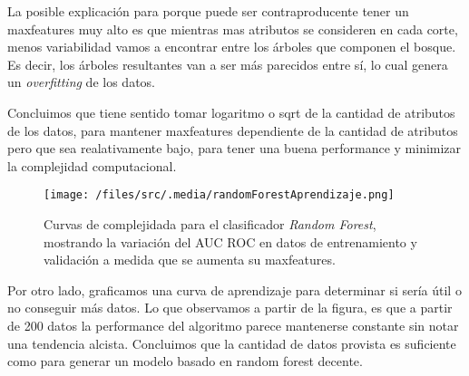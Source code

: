 La posible explicación para porque puede ser contraproducente tener un maxfeatures muy alto es que mientras mas atributos se consideren en cada corte, menos variabilidad vamos a encontrar entre los árboles que componen el bosque. Es decir, los árboles resultantes van a ser más parecidos entre sí, lo cual genera un \textit{overfitting} de los datos.  

Concluimos que tiene sentido tomar logaritmo o sqrt de la cantidad de atributos de los datos, para mantener maxfeatures dependiente de la cantidad de atributos pero que sea realativamente bajo, para tener una buena performance y minimizar la complejidad computacional. 

\begin{figure}[!htbp]
    \centering
    \texttt{[image: /files/src/.media/randomForestAprendizaje.png]}
    \caption{Curvas de complejidada para el clasificador \textit{Random Forest}, mostrando la variación del AUC ROC en datos de entrenamiento y validación a medida que se aumenta su maxfeatures.}
    \label{RFLearning}
\end{figure}


Por otro lado, graficamos una curva de aprendizaje para determinar si sería útil o no conseguir más datos. Lo que observamos a partir de la figura, es que a partir de 200 datos la performance del algoritmo parece mantenerse constante sin notar una tendencia alcista. Concluimos que la cantidad de datos provista es suficiente como para generar un modelo basado en random forest decente. 